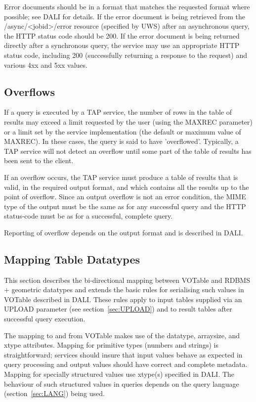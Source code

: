 \documentclass[11pt,letter]{ivoa}
\begin{document}
Error documents should be in a format that matches the requested
format where possible; see DALI for details. 
If the error document is being retrieved 
from the /async/<jobid>/error resource (specified by UWS) after an asynchronous 
query, the HTTP status code should be 200. If the error document is being 
returned directly after a synchronous query, the service may use an appropriate 
HTTP status code, including 200 (successfully returning a response to the 
request) and various 4xx and 5xx values.

\subsection{Overflows}
\label{sec:query-overflow}

If a query is executed by a TAP service, the number of rows in the table of 
results may exceed a limit requested by the user (using the MAXREC parameter) 
or a limit set by the service implementation (the default or maximum value of 
MAXREC). In these cases, the query is said to have 'overflowed'. Typically, a 
TAP service will not detect an overflow until some part of the table of results 
has been sent to the client.

If an overflow occurs, the TAP service must produce a table of results that is 
valid, in the required output format, and which contains all the results up to 
the point of overflow. Since an output overflow is not an error condition, the 
MIME type of the output must be the same as for any successful query and the 
HTTP status-code must be as for a successful, complete query.

Reporting of overflow depends on the output format and is described in DALI.

\subsection{Mapping Table Datatypes}
\label{sec:vot-rdbms}

This section describes the bi-directional mapping between VOTable and RDBMS + 
geometric datatypes and extends the basic rules for serialising such values in 
VOTable described in DALI. These rules apply to input tables 
supplied via an UPLOAD parameter (see section~\ref{sec:UPLOAD}) and to result tables after successful 
query execution.

The mapping to and from VOTable makes use of the datatype, arraysize, and xtype 
attributes. Mapping for primitive types (numbers and strings) is 
straightforward; services should insure that input values behave as 
expected in query processing and output values should have correct and complete 
metadata. Mapping for specially structured values use xtype(s) specified
in DALI. The behaviour of such structured values in queries depends 
on the query language (section~\ref{sec:LANG}) being used. 
\end{document}
